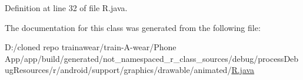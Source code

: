 Definition at line 32 of file R.\+java.



The documentation for this class was generated from the following file\+:\begin{DoxyCompactItemize}
\item 
D\+:/cloned repo trainawear/train-\/\+A-\/wear/\+Phone App/app/build/generated/not\+\_\+namespaced\+\_\+r\+\_\+class\+\_\+sources/debug/process\+Debug\+Resources/r/android/support/graphics/drawable/animated/\mbox{\hyperlink{process_debug_resources_2r_2android_2support_2graphics_2drawable_2animated_2_r_8java}{R.\+java}}\end{DoxyCompactItemize}
